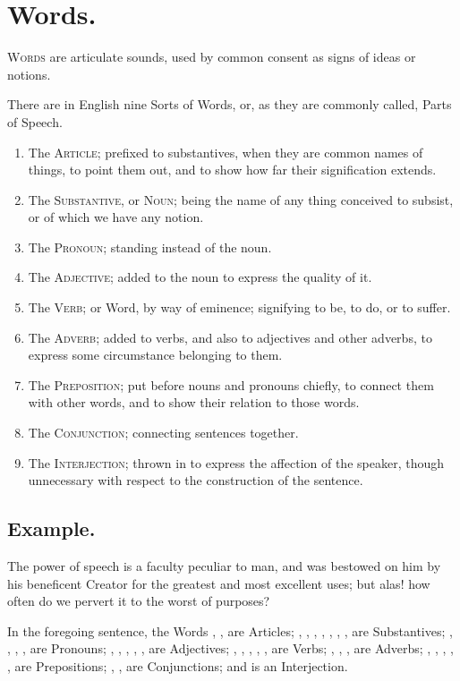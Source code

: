 \section{Words.}

\textsc{Words} are articulate sounds, used by common consent as signs of
ideas or notions.

There are in English nine Sorts of Words, or, as they are commonly
called, Parts of Speech.

\begin{enumerate}
\item The \textsc{Article}; prefixed to substantives, when they are
  common names of things, to point them out, and to show how far their
  signification extends.
\item The \textsc{Substantive}, or \textsc{Noun}; being the name of any
  thing conceived to subsist, or of which we have any notion.
\item The \textsc{Pronoun}; standing instead of the noun.
\item The \textsc{Adjective}; added to the noun to express the quality
  of it.
\item The \textsc{Verb}; or Word, by way of eminence; signifying to be,
  to do, or to suffer.
\item The \textsc{Adverb}; added to verbs, and also to adjectives and
  other adverbs, to express some circumstance belonging to them.
\item The \textsc{Preposition}; put before nouns and pronouns chiefly,
  to connect them with other words, and to show their relation to those
  words.
\item The \textsc{Conjunction}; connecting sentences together.
\item The \textsc{Interjection}; thrown in to express the affection of
  the speaker, though unnecessary with respect to the construction of
  the sentence.
\end{enumerate}

\subsection{Example.}

The power of speech is a faculty peculiar to man, and was bestowed on
him by his beneficent Creator for the greatest and most excellent uses;
but alas! how often do we pervert it to the worst of purposes?

In the foregoing sentence, the Words , , are Articles;
, , , , ,
, , are Substantives; , , ,
, are Pronouns; , , ,
, , are Adjectives; , ,
, , , are Verbs; , ,
, are Adverbs; , , , , ,
are Prepositions; , , are Conjunctions; and  is
an Interjection.

